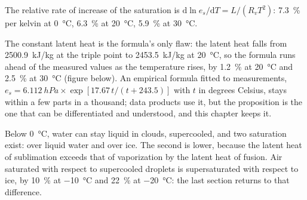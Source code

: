 \begin{corollary}\label{cor:b2:atmospheric-thermodynamics:seven}
The relative rate of increase of the saturation  is
$\mathrm{d}\ln e_s/\mathrm{d}T = L/(R_v T^2)$: \qty{7.3}{\percent} per kelvin at
\qty{0}{\celsius}, \qty{6.3}{\percent} at \qty{20}{\celsius}, \qty{5.9}{\percent} at
\qty{30}{\celsius}.
\end{corollary}

The constant latent heat is the formula's only flaw: the latent heat falls from
\qty{2500.9}{kJ/kg} at the triple point to \qty{2453.5}{kJ/kg} at \qty{20}{\celsius}, so the
formula runs ahead of the measured values as the temperature rises, by \qty{1.2}{\percent} at
\qty{20}{\celsius} and \qty{2.5}{\percent} at \qty{30}{\celsius} (figure below). An empirical
formula fitted to measurements, $e_s = \qty{6.112}{hPa} \times \exp[17.67\,t/(t + 243.5)]$ with
$t$ in degrees Celsius, stays within a few parts in a thousand; data products use it, but the
proposition is the one that can be differentiated and understood, and this chapter keeps it.

Below \qty{0}{\celsius}, water can stay liquid in clouds, supercooled, and two saturation
 exist: over liquid water and over ice. The second is lower, because the latent
heat of sublimation exceeds that of vaporization by the latent heat of fusion. Air saturated with
respect to supercooled droplets is supersaturated with respect to ice, by \qty{10}{\percent} at
\qty{-10}{\celsius} and \qty{22}{\percent} at \qty{-20}{\celsius}: the last section returns to
that difference.

